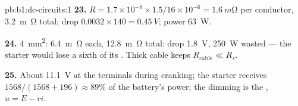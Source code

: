 \begin{solution}{pb:b1:dc-circuits:1}
\textbf{23.} $R = 1.7\times10^{-8} \times 1.5/16\times10^{-6} =
\qty{1.6}{m\ohm}$ per conductor, \qty{3.2}{m\ohm} total; drop $0.0032
\times 140 = \qty{0.45}{V}$; power \qty{63}{W}.

\textbf{24.} \qty{4}{mm^2}: \qty{6.4}{m\ohm} each, \qty{12.8}{m\ohm}
total: drop \qty{1.8}{V}, \qty{250}{W} wasted --- the starter would lose
a sixth of its . Thick cable keeps $R_{\text{cable}} \ll R_s$.

\textbf{25.} About \qty{11.1}{V} at the terminals during cranking; the
starter receives $1568/(1568 + 196) \approx 89\%$ of the battery's
power; the dimming is the , $u = E - ri$.
\end{solution}
